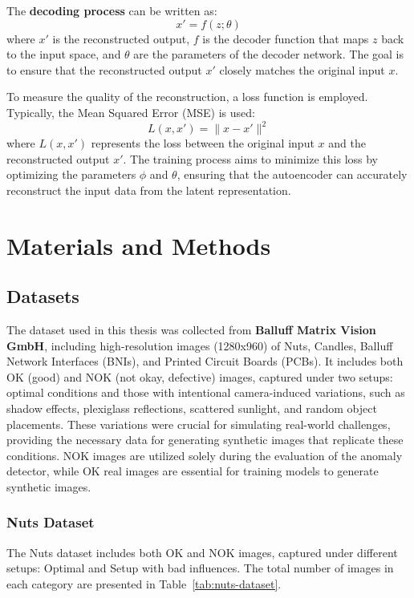 \documentclass[12pt,DIV14,BCOR12mm,a4paper,footinclude=false,headinclude,parskip=half-,twoside,openright,cleardoublepage=empty,toc=index,bibliography=totoc,listof=totoc]{scrreprt}
\numberwithin{equation}{chapter}
\begin{document}
The \textbf{decoding process} can be written as:
\begin{equation}
x' = f(z; \theta)
\end{equation}
where \( x' \) is the reconstructed output, \( f \) is the decoder function that maps \( z \) back to the input space, and \( \theta \) are the parameters of the decoder network. The goal is to ensure that the reconstructed output \( x' \) closely matches the original input \( x \).

To measure the quality of the reconstruction, a loss function is employed. Typically, the Mean Squared Error (MSE) is used:
\begin{equation}
L(x, x') = \|x - x'\|^2
\end{equation}
where \( L(x, x') \) represents the loss between the original input \( x \) and the reconstructed output \( x' \). The training process aims to minimize this loss by optimizing the parameters \( \phi \) and \( \theta \), ensuring that the autoencoder can accurately reconstruct the input data from the latent representation.

\chapter{Materials and Methods}
\label{chapter3}
\section{Datasets}
The dataset used in this thesis was collected from \textbf{Balluff Matrix Vision GmbH}, including high-resolution images (1280x960) of Nuts, Candles, Balluff Network Interfaces (BNIs), and Printed Circuit Boards (PCBs). It includes both OK (good) and NOK (not okay, defective) images, captured under two setups: optimal conditions and those with intentional camera-induced variations, such as shadow effects, plexiglass reflections, scattered sunlight, and random object placements. These variations were crucial for simulating real-world challenges, providing the necessary data for generating synthetic images that replicate these conditions. NOK images are utilized solely during the evaluation of the anomaly detector, while OK real images are essential for training models to generate synthetic images.
\subsection{Nuts Dataset}
\label{sec:nuts_dataset}
The Nuts dataset includes both OK and NOK images, captured under different setups: Optimal and Setup with bad influences. The total number of images in each category are presented in Table~\ref{tab:nuts-dataset}.
\end{document}
